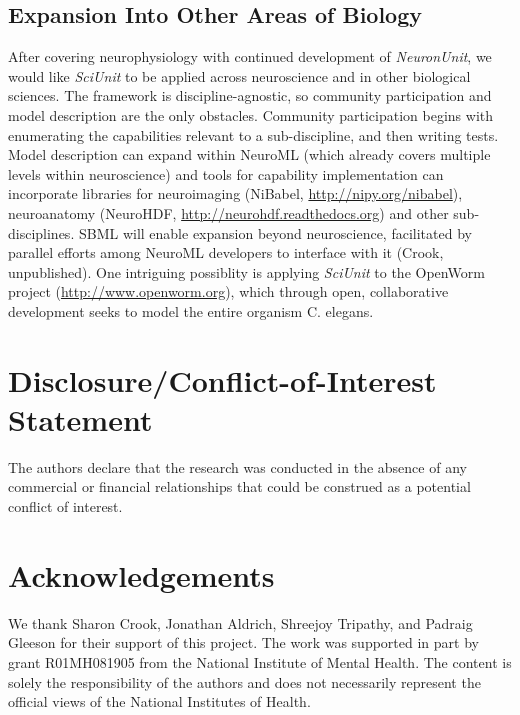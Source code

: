 \documentclass{frontiersSCNS}
\begin{document}
\subsection{Expansion Into Other Areas of Biology}
After covering neurophysiology with continued development of \textit{NeuronUnit}, we would like \textit{SciUnit} to be applied across neuroscience and in other biological sciences. 
The framework is discipline-agnostic, so community participation and model description are the only obstacles. 
Community participation begins with enumerating the capabilities relevant to a sub-discipline, and then writing tests. 
Model description can expand within NeuroML (which already covers multiple levels within neuroscience) and tools for capability implementation can incorporate libraries for neuroimaging (NiBabel, \url{http://nipy.org/nibabel}), neuroanatomy (NeuroHDF, \url{http://neurohdf.readthedocs.org}) and other sub-disciplines. 
SBML will enable expansion beyond neuroscience, facilitated by parallel efforts among NeuroML developers to interface with it (Crook, unpublished). 
One intriguing possiblity is applying \textit{SciUnit} to the OpenWorm project (\url{http://www.openworm.org}), which through open, collaborative development seeks to model the entire organism C. elegans.  

\section*{Disclosure/Conflict-of-Interest Statement}
The authors declare that the research was conducted in the absence of any commercial or financial relationships that could be construed as a potential conflict of interest.

\section*{Acknowledgements}
We thank Sharon Crook, Jonathan Aldrich, Shreejoy Tripathy, and Padraig Gleeson for their support of this project.  
The work was supported in part by grant R01MH081905 from the National Institute of Mental Health. 
The content is solely the responsibility of the authors and does not necessarily represent the official views of the National Institutes of Health.



%
%
\end{document}
